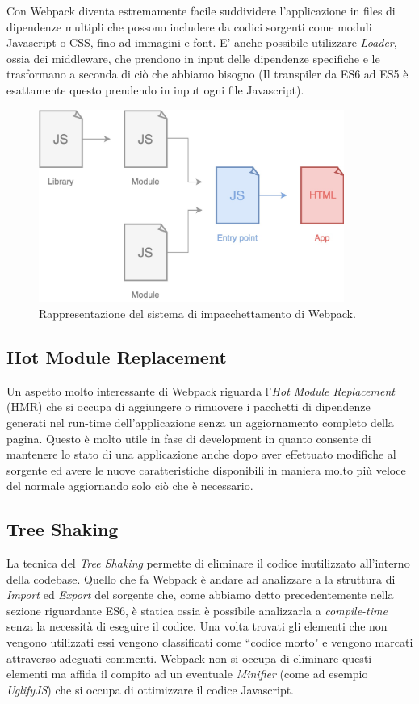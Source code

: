 Con Webpack diventa estremamente facile suddividere l'applicazione in files di dipendenze multipli che possono includere da codici sorgenti come moduli Javascript o CSS, fino ad immagini e font.
E' anche possibile utilizzare \textit{Loader}, ossia dei middleware, che prendono in input delle dipendenze specifiche e le trasformano a seconda di ciò che abbiamo bisogno (Il transpiler da ES6 ad ES5 è esattamente questo prendendo in input ogni file Javascript).

\begin{figure}[h]
\centering
\includegraphics[width=10cm]{./images/webpackWorkflow}
\caption{Rappresentazione del sistema di impacchettamento di Webpack.}
\end{figure}

\subsection{Hot Module Replacement}
Un aspetto molto interessante di Webpack riguarda l'\textit{Hot Module Replacement} (HMR) che si occupa di aggiungere o rimuovere i pacchetti di dipendenze generati nel run-time dell'applicazione senza un aggiornamento completo della pagina. Questo è molto utile in fase di development in quanto consente di mantenere lo stato di una applicazione anche dopo aver effettuato modifiche al sorgente ed avere le nuove caratteristiche disponibili in maniera molto più veloce del normale aggiornando solo ciò che è necessario. 

\subsection{Tree Shaking}
La tecnica del \textit{Tree Shaking} permette di eliminare il codice inutilizzato all'interno della codebase. Quello che fa Webpack è andare ad analizzare a la struttura di \textit{Import} ed \textit{Export} del sorgente che, come abbiamo detto precedentemente nella sezione riguardante ES6, è statica ossia è possibile analizzarla a \textit{compile-time} senza la necessità di eseguire il codice. Una volta trovati gli elementi che non vengono utilizzati essi vengono classificati come “codice morto" e vengono marcati attraverso adeguati commenti. Webpack non si occupa di eliminare questi elementi ma affida il compito ad un eventuale \textit{Minifier} (come ad esempio \textit{UglifyJS}) che si occupa di ottimizzare il codice Javascript.

